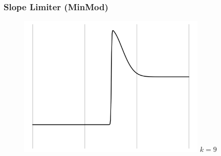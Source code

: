 \documentclass{beamer}
\begin{document}
\begin{frame}
\frametitle{Slope Limiter (MinMod)}

  \begin{figure}
    \begin{overprint}
        \centering\includegraphics[width=0.8\textwidth]{./fig.sl_00.png}
        $k = 9$


\end{overprint}
\end{figure}
\end{frame}
\end{document}
